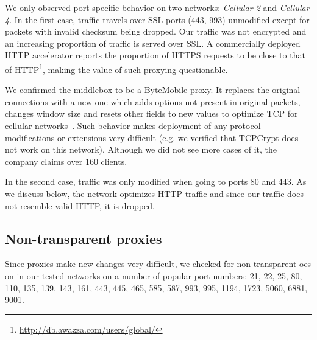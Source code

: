 \documentclass{sig-alternate-10pt}
\begin{document}
We only observed port-specific behavior on two networks: \emph{Cellular 2} and \emph{Cellular 4}. In the first case, traffic travels over SSL ports (443, 993) unmodified except for packets with invalid checksum being dropped. Our traffic was not encrypted and an increasing proportion of traffic is served over SSL. A commercially deployed HTTP accelerator reports the proportion of HTTPS requests to be close to that of HTTP\footnote{\url{http://db.awazza.com/users/global/}}, making the value of such proxying questionable.

We confirmed the middlebox to be a ByteMobile proxy. It replaces the original connections with a new one which adds options not present in original packets, changes window size and resets other fields to new values to optimize TCP for cellular networks~\cite{Ha:2006td}. Such behavior makes deployment of any protocol modifications or extensions very difficult (e.g. we verified that TCPCrypt does not work on this network). Although we did not see more cases of it, the company claims over 160 clients.

In the second case, traffic was only modified when going to ports 80 and 443. As we discuss below, the network optimizes HTTP traffic and since our traffic does not resemble valid HTTP, it is dropped.

\subsection{Non-transparent proxies}
\label{sec:proxies}

Since proxies make new changes very difficult, we checked for non-transparent oes on in our tested networks on a number of popular port numbers:
21, 22, 25, 80, 110, 135, 139, 143, 161, 443, 445, 465, 585, 587, 993, 995, 1194, 1723, 5060, 6881, 9001.
\end{document}
